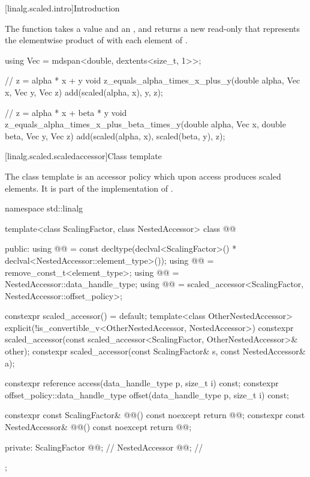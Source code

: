 [linalg.scaled.intro]{Introduction}

\pnum
The  function
takes a value  and an  , and
returns a new read-only 
that represents
the elementwise product of  with each element of .
\begin{example}
\begin{codeblock}
using Vec = mdspan<double, dextents<size_t, 1>>;

// z = alpha * x + y
void z_equals_alpha_times_x_plus_y(double alpha, Vec x, Vec y, Vec z) {
  add(scaled(alpha, x), y, z);
}

// z = alpha * x + beta * y
void z_equals_alpha_times_x_plus_beta_times_y(double alpha, Vec x, double beta, Vec y, Vec z) {
  add(scaled(alpha, x), scaled(beta, y), z);
}
\end{codeblock}
\end{example}

[linalg.scaled.scaledaccessor]{Class template }

\pnum
The class template  is an  accessor policy
which upon access produces scaled elements.
It is part of the implementation of .
\begin{codeblock}
namespace std::linalg {
  template<class ScalingFactor, class NestedAccessor>
  class @@ {
  public:
    using @@ =
      const decltype(declval<ScalingFactor>() * declval<NestedAccessor::element_type>());
    using @@ = remove_const_t<element_type>;
    using @@ = NestedAccessor::data_handle_type;
    using @@ = scaled_accessor<ScalingFactor, NestedAccessor::offset_policy>;

    constexpr scaled_accessor() = default;
    template<class OtherNestedAccessor>
      explicit(!is_convertible_v<OtherNestedAccessor, NestedAccessor>)
        constexpr scaled_accessor(const scaled_accessor<ScalingFactor,
                                                        OtherNestedAccessor>& other);
    constexpr scaled_accessor(const ScalingFactor& s, const NestedAccessor& a);

    constexpr reference access(data_handle_type p, size_t i) const;
    constexpr offset_policy::data_handle_type offset(data_handle_type p, size_t i) const;

    constexpr const ScalingFactor& @@() const noexcept { return @@; }
    constexpr const NestedAccessor& @@() const noexcept { return @@; }

  private:
    ScalingFactor @@{};                              // \expos
    NestedAccessor @@{};                            // \expos
  };
}
\end{codeblock}

